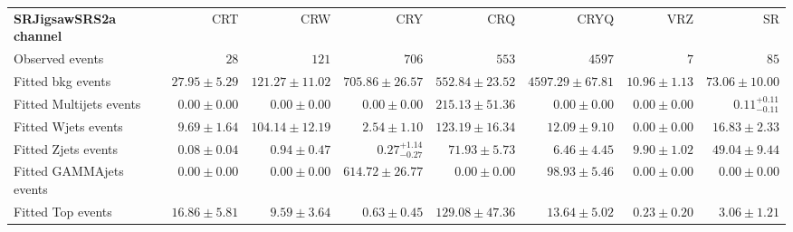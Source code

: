

\begin{table}
\begin{center}
\setlength{\tabcolsep}{0.0pc}
{\tiny
\begin{tabular*}{\textwidth}{@{\extracolsep{\fill}}lrrrrrrr}
\noalign{\smallskip}\hline\noalign{\smallskip}
{\bf SRJigsawSRS2a channel}           & CRT            & CRW            & CRY            & CRQ            & CRYQ            & VRZ            & SR              \\[-0.05cm]
\noalign{\smallskip}\hline\noalign{\smallskip}
Observed events          & $28$              & $121$              & $706$              & $553$              & $4597$              & $7$              & $85$                    \\
\noalign{\smallskip}\hline\noalign{\smallskip}
Fitted bkg events         & $27.95 \pm 5.29$          & $121.27 \pm 11.02$          & $705.86 \pm 26.57$          & $552.84 \pm 23.52$          & $4597.29 \pm 67.81$          & $10.96 \pm 1.13$          & $73.06 \pm 10.00$              \\
\noalign{\smallskip}\hline\noalign{\smallskip}
        Fitted Multijets events         & $0.00 \pm 0.00$          & $0.00 \pm 0.00$          & $0.00 \pm 0.00$          & $215.13 \pm 51.36$          & $0.00 \pm 0.00$          & $0.00 \pm 0.00$          & $0.11_{-0.11}^{+0.11}$              \\
        Fitted Wjets events         & $9.69 \pm 1.64$          & $104.14 \pm 12.19$          & $2.54 \pm 1.10$          & $123.19 \pm 16.34$          & $12.09 \pm 9.10$          & $0.00 \pm 0.00$          & $16.83 \pm 2.33$              \\
        Fitted Zjets events         & $0.08 \pm 0.04$          & $0.94 \pm 0.47$          & $0.27_{-0.27}^{+1.14}$          & $71.93 \pm 5.73$          & $6.46 \pm 4.45$          & $9.90 \pm 1.02$          & $49.04 \pm 9.44$              \\
        Fitted GAMMAjets events         & $0.00 \pm 0.00$          & $0.00 \pm 0.00$          & $614.72 \pm 26.77$          & $0.00 \pm 0.00$          & $98.93 \pm 5.46$          & $0.00 \pm 0.00$          & $0.00 \pm 0.00$              \\
        Fitted Top events         & $16.86 \pm 5.81$          & $9.59 \pm 3.64$          & $0.63 \pm 0.45$          & $129.08 \pm 47.36$          & $13.64 \pm 5.02$          & $0.23 \pm 0.20$          & $3.06 \pm 1.21$              \\

\end{tabular*}}
\end{center}
\end{table}
